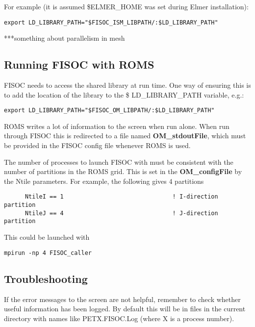 \documentclass[12pt]{article}
\begin{document}
For example (it is assumed \$ELMER\_HOME was set during Elmer installation):
\begin{lstlisting}
export LD_LIBRARY_PATH="$FISOC_ISM_LIBPATH/:$LD_LIBRARY_PATH"
\end{lstlisting}

***something about parallelism in mesh



\subsection{Running FISOC with ROMS}
\label{sec:runningROMS}

FISOC needs to access the shared library at run time.  One way of ensuring this 
is to add the location of the library to the \$ LD\_LIBRARY\_PATH variable, e.g.:
\begin{lstlisting}
export LD_LIBRARY_PATH="$FISOC_OM_LIBPATH/:$LD_LIBRARY_PATH"
\end{lstlisting}

ROMS writes a lot of information to the screen when run alone.  
When run through FISOC this is redirected to a file named 
\textbf{OM\_stdoutFile}, which must be provided in the FISOC config file 
whenever ROMS is used.

The number of processes to launch FISOC with must be consistent with the number of 
partitions in the ROMS grid.  This is set in the \textbf{OM\_configFile} by the 
Ntile parameters.  For example, the following gives 4 partitions
\begin{lstlisting}
      NtileI == 1                               ! I-direction partition
      NtileJ == 4                               ! J-direction partition
\end{lstlisting}
This could be launched with
\begin{lstlisting}
mpirun -np 4 FISOC_caller
\end{lstlisting}


\subsection{Troubleshooting}

If the error messages to the screen are not helpful, remember to check whether useful 
information has been logged.  By default this will be in files in the current directory 
with names like PETX.FISOC.Log (where X is a process number).
\end{document}

